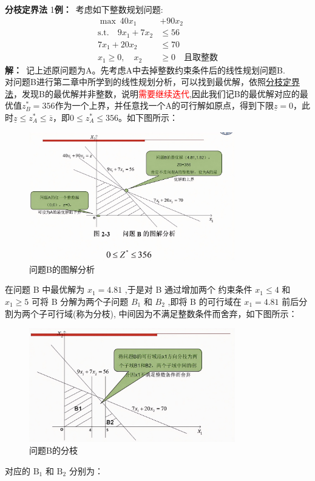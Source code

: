     \begin{exbox}{\textbf{分枝定界法}}
        1\textbf{例：}\ 考虑如下整数规划问题:
        \begin{align}
            \max \ 40x_{1} &+ 90x_{2} \\
            \text{s.t.} \quad 9x_{1} + 7x_{2} &\leq 56 \\
            7x_{1} + 20x_{2} &\leq 70 \\
            x_{1} \geq 0, \quad x_{2} &\geq 0 \quad \text{且取整数}
        \end{align}
        \textbf{解：}\ 记上述原问题为A。先考虑A中去掉整数约束条件后的线性规划问题B.
        \\
        对问题B进行第二章中所学到的线性规划分析，可以找到最优解，依照\hyperref[分枝定界法]{分枝定界法}，发现B的最优解并非整数，说明\textcolor{red}{需要继续迭代},因此我们记B的最优解对应的最优值$z_B^*=356$作为一个上界，并任意找一个A的可行解如原点，得到下限$\underline{z}=0$，此时$\underline{z}\leq z_A^* \leq \overline{z}$，即$0\leq z_A^* \leq 356$。如下图所示：\\
        \begin{figure}[H]
            \centering
            \includegraphics[width=0.8\textwidth]{./image/11.png}
            \caption{问题B的图解分析}
            \label{fig:Chapter4_Temporary_Pavilion_3}
        \end{figure}
        在问题 B 中最优解为 \( {x}_{1} = {4.81} \) ,于是对 B 通过增加两个
        约束条件 \( {x}_{1} \leq  4 \) 和 \( {x}_{1} \geq  5 \) 可将 B 分解为两个子问题 \( {B}_{1} \) 和 \( {B}_{2} \) ,即将 B
        的可行域在 \( {x}_{1} = {4.81} \) 前后分割为两个子可行域(称为分枝), 中间因为不满足整数条件而舍弃，如下图所示：
        \begin{figure}[H]
            \centering
            \includegraphics[width=0.8\textwidth]{./image/10.png}
            \caption{问题B的分枝}
            \label{fig:Chapter4_Temporary_Pavilion_4}
        \end{figure}
        对应的 $\text{B}_1$ 和 $\text{B}_2$ 分别为：


\end{exbox}
